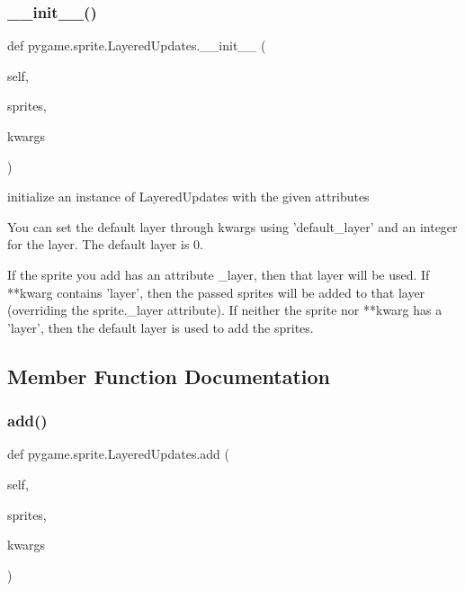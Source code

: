 \subsubsection{\texorpdfstring{\+\_\+\+\_\+init\+\_\+\+\_\+()}{\_\_init\_\_()}}
{\footnotesize\ttfamily def pygame.\+sprite.\+Layered\+Updates.\+\_\+\+\_\+init\+\_\+\+\_\+ (\begin{DoxyParamCaption}\item[{}]{self,  }\item[{}]{sprites,  }\item[{}]{kwargs }\end{DoxyParamCaption})}

\begin{DoxyVerb}initialize an instance of LayeredUpdates with the given attributes

You can set the default layer through kwargs using 'default_layer'
and an integer for the layer. The default layer is 0.

If the sprite you add has an attribute _layer, then that layer will be
used. If **kwarg contains 'layer', then the passed sprites will be
added to that layer (overriding the sprite._layer attribute). If
neither the sprite nor **kwarg has a 'layer', then the default layer is
used to add the sprites.\end{DoxyVerb}
 

\subsection{Member Function Documentation}
\mbox{\label{classpygame_1_1sprite_1_1_layered_updates_afd75d3284641e9ff987c21994b350fed}} 
\subsubsection{\texorpdfstring{add()}{add()}}
{\footnotesize\ttfamily def pygame.\+sprite.\+Layered\+Updates.\+add (\begin{DoxyParamCaption}\item[{}]{self,  }\item[{}]{sprites,  }\item[{}]{kwargs }\end{DoxyParamCaption})}

